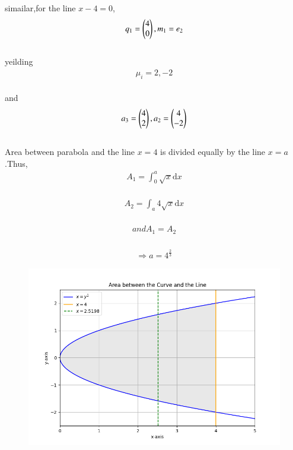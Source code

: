 \documentclass[journal]{IEEEtran}
\begin{document}
  simailar,for the line $x-4=0$,\\
  \begin{align}
                      q_{1}=\begin{pmatrix}
                                    4\\
                                    0\end{pmatrix},m_{1}=e_{2}
  \end{align}\\
  yeilding\\
  \begin{align}
               \mu_{i}=2,-2
  \end{align}\\
   and\\
   \begin{align}
                  a_{3}=\begin{pmatrix}
                               4\\
                               2\end{pmatrix},a_{2}=\begin{pmatrix}4\\
                                               -2\end{pmatrix}
   \end{align}\\
   Area between parabola and the line $x=4$  is divided equally by the line $x=a$.Thus,\\
   \begin{align}
                A_{1}=\int_0^a \sqrt{x}\mathrm{d}x
   \end{align}\\
   \begin{align}
                  A_{2}=\int_a4 \sqrt{x}\mathrm{d}x
   \end{align}\\
    \begin{align}
                 and A_{1}=A_{2}
    \end{align}\\
    \begin{align}
                  \Rightarrow{a=4^\frac{2}{3}}
    \end{align}
\begin{figure}[h!]
        \centering
        \includegraphics[width=0.7\linewidth]{fig/Figure_1.png}
		\caption{}
        \label{stemplot}
\end{figure}

    
 
\end{document}
